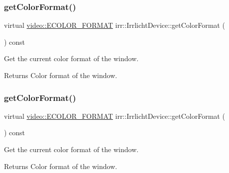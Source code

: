 \subsubsection{\texorpdfstring{get\+Color\+Format()}{getColorFormat()}\hspace{0.1cm}{\footnotesize\ttfamily [1/3]}}
{\footnotesize\ttfamily virtual \hyperlink{namespaceirr_1_1video_a1d5e487888c32b1674a8f75116d829ed}{video\+::\+E\+C\+O\+L\+O\+R\+\_\+\+F\+O\+R\+M\+AT} irr\+::\+Irrlicht\+Device\+::get\+Color\+Format (\begin{DoxyParamCaption}{ }\end{DoxyParamCaption}) const\hspace{0.3cm}{\ttfamily [pure virtual]}}



Get the current color format of the window. 

\begin{DoxyReturn}{Returns}
Color format of the window. 
\end{DoxyReturn}
\mbox{\label{classirr_1_1IrrlichtDevice_a9dccd3d7af7cfbabee46214a89bd6650}} 
\subsubsection{\texorpdfstring{get\+Color\+Format()}{getColorFormat()}\hspace{0.1cm}{\footnotesize\ttfamily [2/3]}}
{\footnotesize\ttfamily virtual \hyperlink{namespaceirr_1_1video_a1d5e487888c32b1674a8f75116d829ed}{video\+::\+E\+C\+O\+L\+O\+R\+\_\+\+F\+O\+R\+M\+AT} irr\+::\+Irrlicht\+Device\+::get\+Color\+Format (\begin{DoxyParamCaption}{ }\end{DoxyParamCaption}) const\hspace{0.3cm}{\ttfamily [pure virtual]}}



Get the current color format of the window. 

\begin{DoxyReturn}{Returns}
Color format of the window. 
\end{DoxyReturn}
\mbox{\label{classirr_1_1IrrlichtDevice_a9dccd3d7af7cfbabee46214a89bd6650}} 
